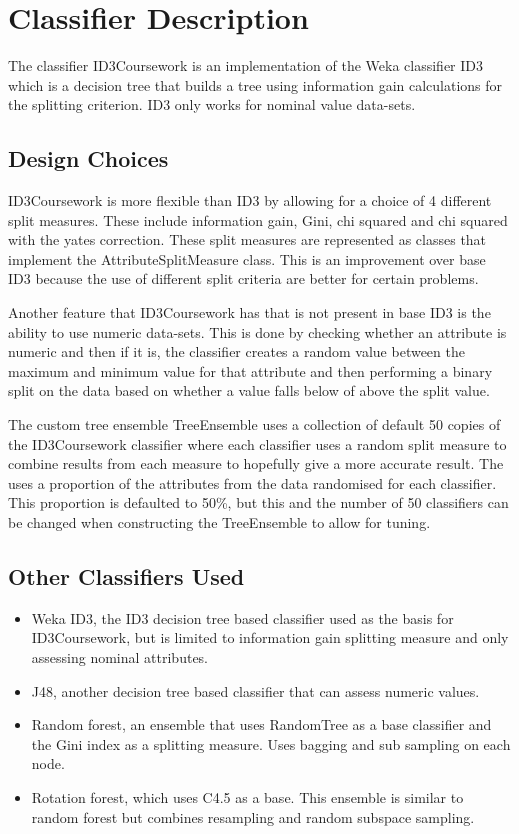 \documentclass{cmppgr}
\begin{document}
\section {Classifier Description}
The classifier ID3Coursework is an implementation of the Weka classifier 
ID3 which is a decision tree that builds a tree using information gain 
calculations for the splitting criterion. ID3 only works for nominal 
value data-sets.

\subsection{Design Choices}
ID3Coursework is more flexible than ID3 by allowing for a choice of 
4 different split measures. These include information gain, Gini, 
chi squared and chi squared with the yates correction. These split 
measures are represented as classes that implement the AttributeSplitMeasure 
class. This is an improvement over base ID3 because the use of different 
split criteria are better for certain problems. 

Another feature that ID3Coursework has that is not present in base ID3 is 
the ability to use numeric data-sets. This is done by checking whether 
an attribute is numeric and then if it is, the classifier creates a 
random value between the maximum and minimum value for that attribute 
and then performing a binary split on the data based on whether a value 
falls below of above the split value. 

The custom tree ensemble TreeEnsemble uses a collection of default 50 copies 
of the ID3Coursework classifier where each classifier uses a random 
split measure to combine results from each measure to hopefully give 
a more accurate result. The uses a proportion of the attributes from 
the data randomised for each classifier. This proportion is defaulted 
to 50\%, but this and the number of 50 classifiers can be changed when 
constructing the TreeEnsemble to allow for tuning. 

\subsection{Other Classifiers Used}
\begin{itemize}
  \item Weka ID3, the ID3 decision tree based classifier used as the 
  basis for ID3Coursework, but is limited to information gain splitting 
  measure and only assessing nominal attributes.
  \item J48, another decision tree based classifier that can assess 
  numeric values.
  \item Random forest, an ensemble that uses RandomTree as a base 
  classifier and the Gini index as a splitting measure. Uses bagging 
  and sub sampling on each node.
  \item Rotation forest, which uses C4.5 as a base. This ensemble is 
  similar to random forest but combines resampling and random subspace 
  sampling.
\end{itemize}
\end{document}
